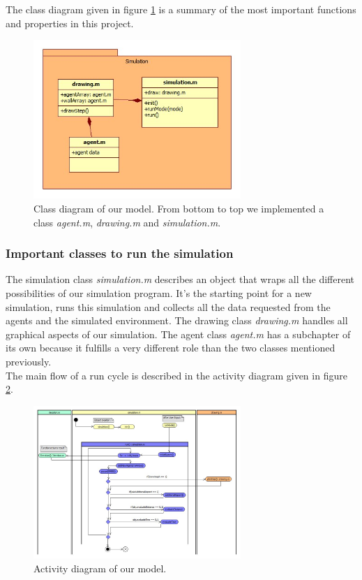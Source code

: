 \noi The class diagram given in figure \ref{fig:classpackage} is a summary of the most important functions and properties in this project.\\

\begin{figure}[h!]
	\centering
		\includegraphics[width=0.70\textwidth]{pictures/classpackage}
	\caption{Class diagram of our model. From bottom to top we implemented a class \textit{agent.m}, \textit{drawing.m} and \textit{simulation.m}.}
	\label{fig:classpackage}
\end{figure}

\subsubsection{Important classes to run the simulation}
\noi The simulation class \textit{simulation.m} describes an object that wraps all the different possibilities of our simulation program. It's the starting point for a new simulation, runs this simulation and collects all the data requested from the agents and the simulated environment. The drawing class \textit{drawing.m} handles all graphical aspects of our simulation. The agent class \textit{agent.m} has a subchapter of its own because it fulfills a very different role than the two classes mentioned previously.\\
The main flow of a run cycle is described in the activity diagram given in figure \ref{fig:activityDiagram}.\\


\begin{figure}[h!]
	\centering
		\includegraphics[width=0.70\textwidth]{pictures/activityDiagram}
	\caption{Activity diagram of our model.}
	\label{fig:activityDiagram}
\end{figure}

